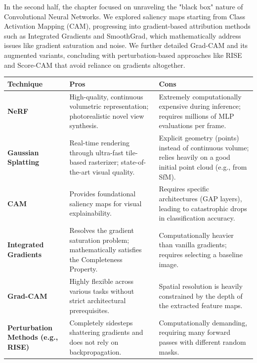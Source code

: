 In the second half, the chapter focused on unraveling the "black box" nature of Convolutional Neural Networks. We explored saliency maps starting from Class Activation Mapping (CAM), progressing into gradient-based attribution methods such as Integrated Gradients and SmoothGrad, which mathematically address issues like gradient saturation and noise. We further detailed Grad-CAM and its augmented variants, concluding with perturbation-based approaches like RISE and Score-CAM that avoid reliance on gradients altogether.

\begin{table}[h]
\centering
\begin{tabularx}{\textwidth}{| >{\centering\arraybackslash}m{3.5cm} | X | X |}
\hline
\textbf{Technique} & \textbf{Pros} & \textbf{Cons} \\
\hline
\textbf{NeRF} & High-quality, continuous volumetric representation; photorealistic novel view synthesis. & Extremely computationally expensive during inference; requires millions of MLP evaluations per frame. \\
\hline
\textbf{Gaussian Splatting} & Real-time rendering through ultra-fast tile-based rasterizer; state-of-the-art visual quality. & Explicit geometry (points) instead of continuous volume; relies heavily on a good initial point cloud (e.g., from SfM). \\
\hline
\textbf{CAM} & Provides foundational saliency maps for visual explainability. & Requires specific architectures (GAP layers), leading to catastrophic drops in classification accuracy. \\
\hline
\textbf{Integrated Gradients} & Resolves the gradient saturation problem; mathematically satisfies the Completeness Property. & Computationally heavier than vanilla gradients; requires selecting a baseline image. \\
\hline
\textbf{Grad-CAM} & Highly flexible across various tasks without strict architectural prerequisites. & Spatial resolution is heavily constrained by the depth of the extracted feature maps. \\
\hline
\textbf{Perturbation Methods (e.g., RISE)} & Completely sidesteps shattering gradients and does not rely on backpropagation. & Computationally demanding, requiring many forward passes with different random masks. \\
\hline
\end{tabularx}
\end{table}

